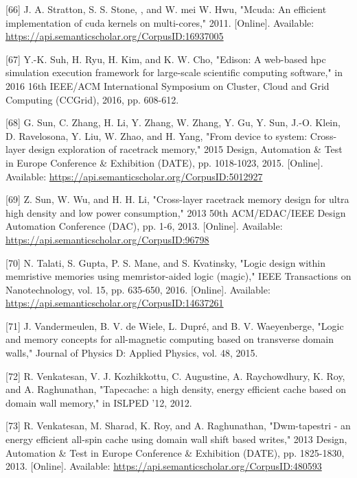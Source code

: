 \documentclass[10pt]{article}
\begin{document}
[66] J. A. Stratton, S. S. Stone, , and W. mei W. Hwu, "Mcuda: An efficient implementation of cuda kernels on multi-cores," 2011. [Online]. Available: \href{https://api.semanticscholar.org/CorpusID:16937005}{https://api.semanticscholar.org/CorpusID:16937005}

[67] Y.-K. Suh, H. Ryu, H. Kim, and K. W. Cho, "Edison: A web-based hpc simulation execution framework for large-scale scientific computing software," in 2016 16th IEEE/ACM International Symposium on Cluster, Cloud and Grid Computing (CCGrid), 2016, pp. 608-612.

[68] G. Sun, C. Zhang, H. Li, Y. Zhang, W. Zhang, Y. Gu, Y. Sun, J.-O. Klein, D. Ravelosona, Y. Liu, W. Zhao, and H. Yang, "From device to system: Cross-layer design exploration of racetrack memory," 2015 Design, Automation \& Test in Europe Conference \& Exhibition (DATE), pp. 1018-1023, 2015. [Online]. Available: \href{https://api.semanticscholar.org/CorpusID:5012927}{https://api.semanticscholar.org/CorpusID:5012927}

[69] Z. Sun, W. Wu, and H. H. Li, "Cross-layer racetrack memory design for ultra high density and low power consumption," 2013 50th ACM/EDAC/IEEE Design Automation Conference (DAC), pp. 1-6, 2013. [Online]. Available: \href{https://api.semanticscholar.org/CorpusID:96798}{https://api.semanticscholar.org/CorpusID:96798}

[70] N. Talati, S. Gupta, P. S. Mane, and S. Kvatinsky, "Logic design within memristive memories using memristor-aided logic (magic)," IEEE Transactions on Nanotechnology, vol. 15, pp. 635-650, 2016. [Online]. Available: \href{https://api.semanticscholar.org/CorpusID:14637261}{https://api.semanticscholar.org/CorpusID:14637261}

[71] J. Vandermeulen, B. V. de Wiele, L. Dupré, and B. V. Waeyenberge, "Logic and memory concepts for all-magnetic computing based on transverse domain walls," Journal of Physics D: Applied Physics, vol. 48, 2015.

[72] R. Venkatesan, V. J. Kozhikkottu, C. Augustine, A. Raychowdhury, K. Roy, and A. Raghunathan, "Tapecache: a high density, energy efficient cache based on domain wall memory," in ISLPED '12, 2012.

[73] R. Venkatesan, M. Sharad, K. Roy, and A. Raghunathan, "Dwm-tapestri - an energy efficient all-spin cache using domain wall shift based writes," 2013 Design, Automation \& Test in Europe Conference \& Exhibition (DATE), pp. 1825-1830, 2013. [Online]. Available: \href{https://api.semanticscholar.org/CorpusID:480593}{https://api.semanticscholar.org/CorpusID:480593}
\end{document}
